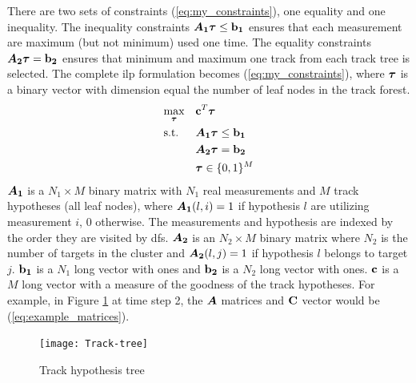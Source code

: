 There are two sets of constraints (\ref{eq:my_constraints}), one equality and one inequality. The inequality constraints $\bm{A_1} \boldsymbol{\mathbf{\tau}} \leq \boldsymbol{\mathbf{b_1}}$ ensures that each measurement are maximum (but not minimum) used one time. The equality constraints $\bm{A_2} \boldsymbol{\mathbf{\tau}} = \boldsymbol{\mathbf{b_2}}$ ensures that minimum and maximum one track from each track tree is selected. The complete \gls{ilp} formulation becomes (\ref{eq:my_constraints}), where $\boldsymbol{\mathbf{\tau}}$ is a binary vector with dimension equal the number of leaf nodes in the track forest.
\begin{equation}
\begin{aligned}
&	\underset{\boldsymbol{\mathbf{\tau}}}{\text{max}}
&&	\boldsymbol{\mathbf{c}}^T \boldsymbol{\mathbf{\tau}} \\
&	\text{s.t.}
&&	\bm{A_1} \boldsymbol{\mathbf{\tau}} \leq \boldsymbol{\mathbf{b_1}} 	\\
&&&	\bm{A_2} \boldsymbol{\mathbf{\tau}} = \boldsymbol{\mathbf{b_2}}	\\
&&&	\boldsymbol{\mathbf{\tau}} \in \{0,1\}^M
\end{aligned}
\label{eq:my_constraints}
\end{equation}
$\bm{A_1}$ is a $N_1 \times M$ binary matrix with $N_1$ real measurements and $M$ track hypotheses (all leaf nodes), where $\bm{A_1}(l,i)=1$ if hypothesis $l$ are utilizing measurement $i$, $0$ otherwise. The measurements and hypothesis are indexed by the order they are visited by \gls{dfs}. $\bm{A_2}$ is an $N_2 \times M$ binary matrix where $N_2$ is the number of targets in the cluster and $\bm{A_2}(l,j)=1$ if hypothesis $l$ belongs to target $j$. $\boldsymbol{\mathbf{b_1}}$ is a $N_1$ long vector with ones and $\boldsymbol{\mathbf{b_2}}$ is a $N_2$ long vector with ones. $\boldsymbol{\mathbf{c}}$ is a $M$ long vector with a measure of the goodness of the track hypotheses. For example, in Figure \ref{fig:hyp-tree} at time step 2, the $\bm{A}$ matrices and $\boldsymbol{\mathbf{C}}$ vector would be (\ref{eq:example_matrices}).
\begin{figure}[H]
\centering
\texttt{[image: Track-tree]}
\caption{Track hypothesis tree}
\label{fig:hyp-tree}
\end{figure}

